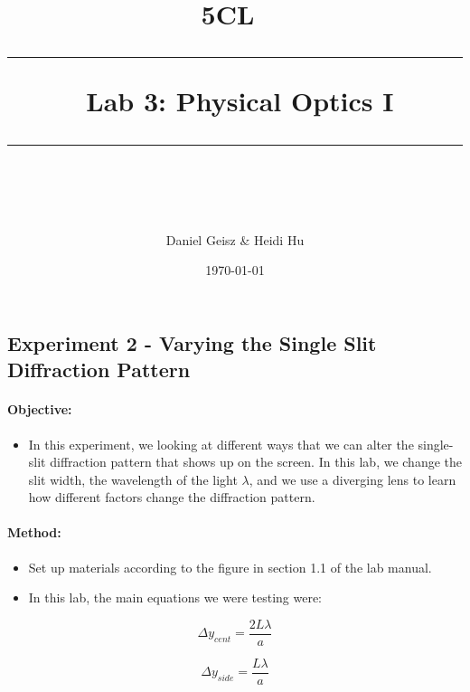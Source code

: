 \documentclass[11pt]{article}
\title{	
	\normalfont\normalsize
	\textsc{ 5CL}\ %
	\vspace{25pt} %
	\rule{\linewidth}{0.5pt}\ %
	\vspace{20pt} %
	{\huge Lab 3: Physical Optics I}\ %
	\vspace{12pt} %
	\rule{\linewidth}{2pt}\ %
	\vspace{12pt} %
}
\author{\LARGE Daniel Geisz \& Heidi Hu} %
\date{\normalsize\today}
\providecommand{\tightlist}{%
      \setlength{\itemsep}{0pt}\setlength{\parskip}{0pt}}
\begin{document}
    
    
    \maketitle

    \hypertarget{experiment-2---varying-the-single-slit-diffraction-pattern}{%
\subsection{Experiment 2 - Varying the Single Slit Diffraction
Pattern}\label{experiment-2---varying-the-single-slit-diffraction-pattern}}

\hypertarget{objective}{%
\paragraph{Objective:}\label{objective}}

\begin{itemize}
\tightlist
\item
  In this experiment, we looking at different ways that we can alter the
  single-slit diffraction pattern that shows up on the screen. In this
  lab, we change the slit width, the wavelength of the light
  \(\lambda\), and we use a diverging lens to learn how different
  factors change the diffraction pattern.
\end{itemize}

\hypertarget{method}{%
\paragraph{Method:}\label{method}}

\begin{itemize}
\item
  Set up materials according to the figure in section 1.1 of the lab
  manual.
\item
  In this lab, the main equations we were testing were:
\end{itemize}

\[ \Delta y_{cent} = \frac{2L\lambda}{a}\]

\[ \Delta y_{side} = \frac{L\lambda}{a}\]
\end{document}
